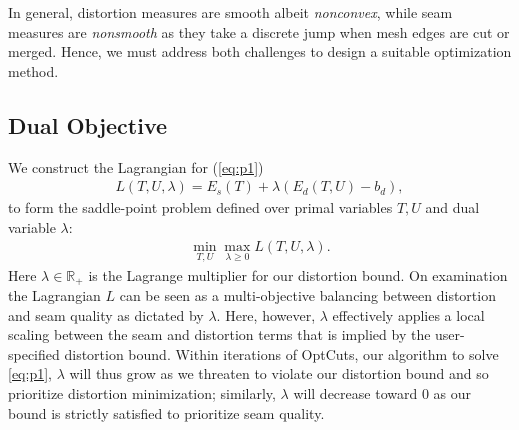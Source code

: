 In general, distortion measures are smooth albeit \emph{nonconvex}, while seam measures are \emph{nonsmooth} as they take a discrete jump when mesh edges are cut or merged. Hence, we must address both challenges to design a suitable optimization method. 

%


\subsection{Dual Objective}
We construct the Lagrangian for (\ref{eq:p1})  %
\begin{align}
	L(T,U,\lambda) = E_s(T) + \lambda(E_d(T,U) - b_d),
	\label{eq:L}
\end{align}
%
to form the saddle-point problem defined over primal variables $T,U$ and dual variable $\lambda$:
%
\begin{align}
	\min_{T,U} \max_{\lambda\geq0} L(T,U,\lambda).
	\label{eq:p2}
\end{align}
%
Here $\lambda \in \mathbb{R_+}$ is the Lagrange multiplier for our distortion bound. On examination the Lagrangian $L$ can be seen as a multi-objective balancing between distortion and seam quality as dictated by $\lambda$. Here, however, $\lambda$ effectively applies a local scaling between the seam and distortion terms that is implied %
by the user-specified distortion bound. Within iterations of OptCuts, our algorithm to solve \eqref{eq:p1}, $\lambda$ will thus grow as we threaten to violate our distortion bound and so prioritize distortion minimization; similarly, $\lambda$ will decrease toward $0$ as our bound is strictly satisfied to prioritize seam quality.


